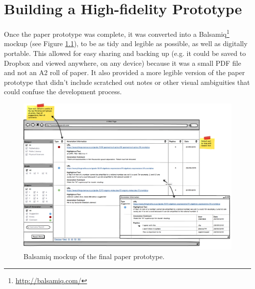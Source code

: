 
\chapter{Building a High-fidelity Prototype} %

\label{Building a High-fidelity Prototype} %



Once the paper prototype was complete, it was converted into a Balsamiq\footnote{\href{http://balsamiq.com/}{http://balsamiq.com/}} mockup (see Figure  \ref{fig:Balsamiq}), to be as tidy and legible as possible, as well as digitally portable. This allowed for easy sharing and backing up (e.g. it could be saved to Dropbox and viewed anywhere, on any device) because it was a small PDF file and not an A2 roll of paper. It also provided a more legible version of the paper prototype that didn't include scratched out notes or other visual ambiguities that could confuse the development process. 

\begin{figure}
    \centering
    \includegraphics[width=\textwidth]{Figures/BalsamiqMockup.png}
 \caption{Balsamiq mockup of the final paper prototype.}
 \label{fig:Balsamiq}
 \end{figure}

